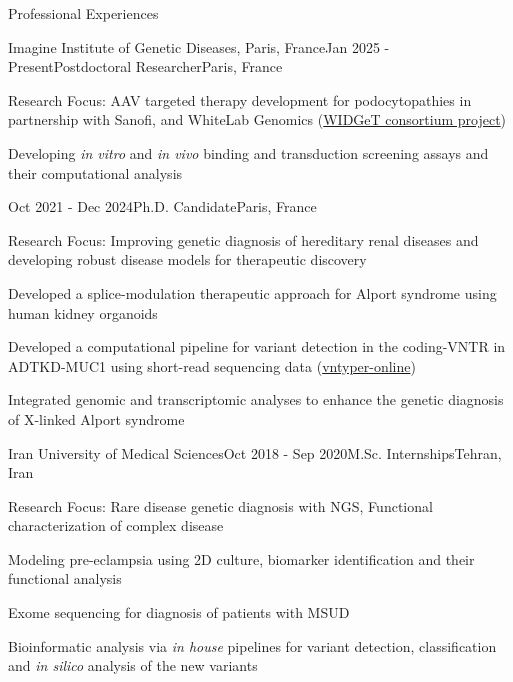 \documentclass[
	11pt, %
]{resume} %
\begin{document}

\begin{rSection}{Professional Experiences}

	\begin{rSubsection}{Imagine Institute of Genetic Diseases, Paris, France}{Jan 2025 - Present}{Postdoctoral Researcher}{Paris, France}
		\item Research Focus: AAV targeted therapy development for podocytopathies in partnership with Sanofi, and WhiteLab Genomics (\href{https://www.institutimagine.org/en/sanofi-whitelab-genomics-target-laboratory-nantes-university-and-institut-imagine-launch-widget}{WIDGeT consortium project})
		\item Developing \textit{in vitro} and \textit{in vivo} binding and transduction screening assays and their computational analysis
	\end{rSubsection}


	\begin{rSubsection}{}{Oct 2021 - Dec 2024}{Ph.D. Candidate}{Paris, France}
		\item Research Focus: Improving genetic diagnosis of hereditary renal diseases and developing robust disease models for therapeutic discovery
		\item Developed a splice-modulation therapeutic approach for Alport syndrome using human kidney organoids
		\item Developed a computational pipeline for variant detection in the coding-VNTR in ADTKD-MUC1 using short-read sequencing data (\href{https://vntyper.org/}{vntyper-online})
		\item Integrated genomic and transcriptomic analyses to enhance the genetic diagnosis of X-linked Alport syndrome
	\end{rSubsection}


	\begin{rSubsection}{Iran University of Medical Sciences}{Oct 2018 - Sep 2020}{M.Sc. Internships}{Tehran, Iran}
		\item Research Focus: Rare disease genetic diagnosis with NGS, Functional characterization of complex disease
		\item Modeling pre-eclampsia using 2D culture, biomarker identification and their functional analysis
		\item Exome sequencing for diagnosis of patients with MSUD
		\item Bioinformatic analysis via \textit{in house} pipelines for variant detection, classification and \textit{in silico} analysis of the new variants
	\end{rSubsection}


\end{rSection}
\end{document}
